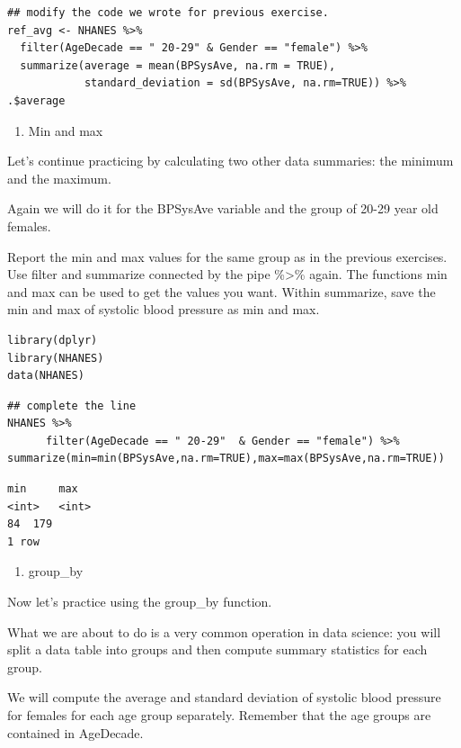 \documentclass[
]{article}
\providecommand{\tightlist}{%
  \setlength{\itemsep}{0pt}\setlength{\parskip}{0pt}}
\begin{document}
\begin{verbatim}
## modify the code we wrote for previous exercise.
ref_avg <- NHANES %>%
  filter(AgeDecade == " 20-29" & Gender == "female") %>%
  summarize(average = mean(BPSysAve, na.rm = TRUE), 
            standard_deviation = sd(BPSysAve, na.rm=TRUE)) %>% .$average
\end{verbatim}

\begin{enumerate}
\def\labelenumi{\arabic{enumi}.}
\setcounter{enumi}{3}
\tightlist
\item
  Min and max
\end{enumerate}

Let's continue practicing by calculating two other data summaries: the
minimum and the maximum.

Again we will do it for the BPSysAve variable and the group of 20-29
year old females.

Report the min and max values for the same group as in the previous
exercises. Use filter and summarize connected by the pipe
\%\textgreater\% again. The functions min and max can be used to get the
values you want. Within summarize, save the min and max of systolic
blood pressure as min and max.

\begin{verbatim}
library(dplyr)
library(NHANES)
data(NHANES)
\end{verbatim}

\begin{verbatim}
## complete the line
NHANES %>%
      filter(AgeDecade == " 20-29"  & Gender == "female") %>% summarize(min=min(BPSysAve,na.rm=TRUE),max=max(BPSysAve,na.rm=TRUE))
\end{verbatim}

\begin{verbatim}
min     max
<int>   <int>
84  179
1 row
\end{verbatim}

\begin{enumerate}
\def\labelenumi{\arabic{enumi}.}
\setcounter{enumi}{4}
\tightlist
\item
  group\_by
\end{enumerate}

Now let's practice using the group\_by function.

What we are about to do is a very common operation in data science: you
will split a data table into groups and then compute summary statistics
for each group.

We will compute the average and standard deviation of systolic blood
pressure for females for each age group separately. Remember that the
age groups are contained in AgeDecade.
\end{document}

